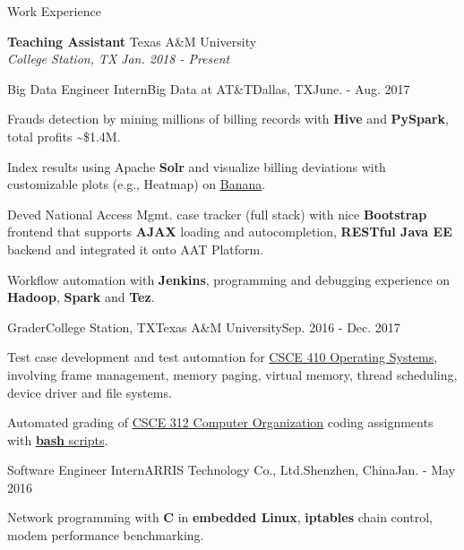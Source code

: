 \documentclass{resume} %
\begin{document}



\begin{rSection}{Work Experience}

{\bf Teaching Assistant} \hfill {Texas A\&M University} 
\\ {\em College Station, TX} \hfill {\em Jan. 2018 - Present}
\vspace*{-0.2em}

\begin{rSubsection}{Big Data Engineer Intern}{Big Data at AT\&T}{Dallas, TX}{June. - Aug. 2017}
\item Frauds detection by mining millions of billing records with \textbf{Hive} and \textbf{PySpark}, total profits \textasciitilde \$1.4M.
\item Index results using Apache \textbf{Solr} and visualize billing deviations with customizable plots (e.g., Heatmap) on \href{https://github.com/lucidworks/banana}{Banana}.
\item Deved National Access Mgmt. case tracker (full stack) with nice \textbf{Bootstrap} frontend that supports \textbf{AJAX} loading and autocompletion, \textbf{RESTful Java EE} backend and integrated it onto AAT Platform.
\item Workflow automation with \textbf{Jenkins}, programming and debugging experience on \textbf{Hadoop}, \textbf{Spark} and \textbf{Tez}.
\end{rSubsection}

\begin{rSubsection}{Grader}{College Station, TX}{Texas A\&M University}{Sep. 2016 - Dec. 2017}
\item Test case development and test automation for \href{http://faculty.cse.tamu.edu/dilma/web-csce410-fall16/index.htm}{CSCE 410 Operating Systems}, involving frame management, memory paging, virtual memory, thread scheduling, device driver and file systems.
\item Automated grading of \href{http://faculty.cse.tamu.edu/djimenez/312/}{CSCE 312 Computer Organization} coding assignments with \href{https://github.com/tamu-csce312/hw-test}{\textbf{bash} scripts}.
\end{rSubsection}

\begin{rSubsection}{Software Engineer Intern}{ARRIS Technology Co., Ltd.}{Shenzhen, China}{Jan. - May 2016}
\item Network programming with \textbf{C} in \textbf{embedded Linux}, \textbf{iptables} chain control, modem performance benchmarking.
\end{rSubsection}


\end{rSection}
\end{document}
